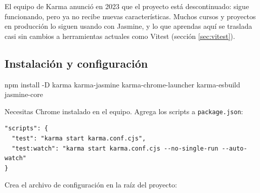 \documentclass[11pt,a4paper]{article}
\newcommand{\cmd}[1]{\texttt{\color{reactdark}#1}}
\begin{document}
\begin{center}
\end{center}

\begin{atencion}
El equipo de Karma anunció en 2023 que el proyecto está descontinuado: sigue funcionando, pero ya no recibe nuevas características. Muchos cursos y proyectos en producción lo siguen usando con Jasmine, y lo que aprendas aquí se traslada casi sin cambios a herramientas actuales como Vitest (sección \ref{sec:vitest}).
\end{atencion}

\subsection{Instalación y configuración}

\begin{terminal}
npm install -D karma karma-jasmine karma-chrome-launcher karma-esbuild jasmine-core
\end{terminal}

Necesitas Chrome instalado en el equipo. Agrega los scripts a \cmd{package.json}:
\begin{lstlisting}[language=JSX,numbers=none]
"scripts": {
  "test": "karma start karma.conf.cjs",
  "test:watch": "karma start karma.conf.cjs --no-single-run --auto-watch"
}
\end{lstlisting}

Crea el archivo de configuración en la raíz del proyecto:
\end{document}
